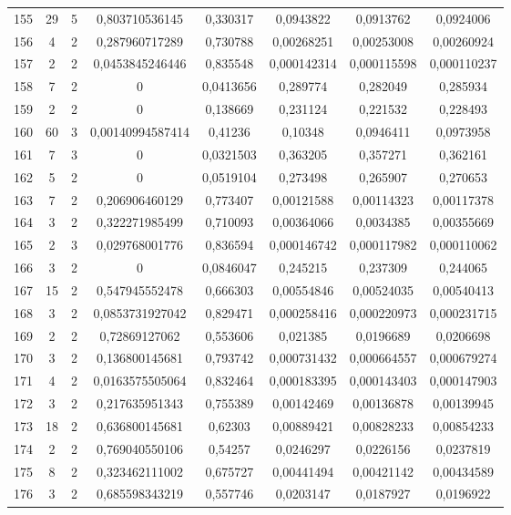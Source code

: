 \begin{longtable}{|c|c|c|c|c|c|c|c|}
155 & 29 & 5 & 0,803710536145 & 0,330317 & 0,0943822 & 0,0913762 & 0,0924006  \\
156 & 4 & 2 & 0,287960717289 & 0,730788 & 0,00268251 & 0,00253008 & 0,00260924  \\
157 & 2 & 2 & 0,0453845246446 & 0,835548 & 0,000142314 & 0,000115598 & 0,000110237  \\
158 & 7 & 2 & 0 & 0,0413656 & 0,289774 & 0,282049 & 0,285934  \\
159 & 2 & 2 & 0 & 0,138669 & 0,231124 & 0,221532 & 0,228493  \\
160 & 60 & 3 & 0,00140994587414 & 0,41236 & 0,10348 & 0,0946411 & 0,0973958  \\
161 & 7 & 3 & 0 & 0,0321503 & 0,363205 & 0,357271 & 0,362161  \\
162 & 5 & 2 & 0 & 0,0519104 & 0,273498 & 0,265907 & 0,270653  \\
163 & 7 & 2 & 0,206906460129 & 0,773407 & 0,00121588 & 0,00114323 & 0,00117378  \\
164 & 3 & 2 & 0,322271985499 & 0,710093 & 0,00364066 & 0,0034385 & 0,00355669  \\
165 & 2 & 3 & 0,029768001776 & 0,836594 & 0,000146742 & 0,000117982 & 0,000110062  \\
166 & 3 & 2 & 0 & 0,0846047 & 0,245215 & 0,237309 & 0,244065  \\
167 & 15 & 2 & 0,547945552478 & 0,666303 & 0,00554846 & 0,00524035 & 0,00540413  \\
168 & 3 & 2 & 0,0853731927042 & 0,829471 & 0,000258416 & 0,000220973 & 0,000231715  \\
169 & 2 & 2 & 0,72869127062 & 0,553606 & 0,021385 & 0,0196689 & 0,0206698  \\
170 & 3 & 2 & 0,136800145681 & 0,793742 & 0,000731432 & 0,000664557 & 0,000679274  \\
171 & 4 & 2 & 0,0163575505064 & 0,832464 & 0,000183395 & 0,000143403 & 0,000147903  \\
172 & 3 & 2 & 0,217635951343 & 0,755389 & 0,00142469 & 0,00136878 & 0,00139945  \\
173 & 18 & 2 & 0,636800145681 & 0,62303 & 0,00889421 & 0,00828233 & 0,00854233  \\
174 & 2 & 2 & 0,769040550106 & 0,54257 & 0,0246297 & 0,0226156 & 0,0237819  \\
175 & 8 & 2 & 0,323462111002 & 0,675727 & 0,00441494 & 0,00421142 & 0,00434589  \\
176 & 3 & 2 & 0,685598343219 & 0,557746 & 0,0203147 & 0,0187927 & 0,0196922  \\

\end{longtable}
